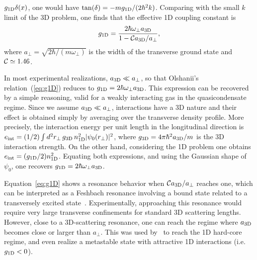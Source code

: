 \documentclass[onecolumn,amsfonts,showpacs,superscriptaddress]{revtex4-1}
\begin{document}
$g_{{\rm 1D}}\delta(x)$, one would have $\tan(\delta)=-m g_{{\rm 1D}}/(2\hbar^2 k)$. Comparing with the small $k$ limit of the 3D problem, one finds that the effective 1D coupling constant is~\citep{olshanii_atomic_1998}
\begin{equation}
g_{{\rm 1D}}=\frac{2\hbar \omega_\perp a_{{\rm 3D}} }{1-{\cal C}a_{{\rm 3D}}/a_\perp} ,
\label{eq:g1D}
\end{equation}
where $a_\perp=\sqrt{2\hbar/(m\omega_\perp)}$ is the width of the transverse ground state and ${\cal C} \simeq 1.46$.


In most experimental realizations, $a_{{\rm 3D}}\ll a_\perp$, so that Olshanii's relation~(\ref{eq:g1D}) reduces to $g_{{\rm 1D}}=2\hbar \omega_\perp a_{{\rm 3D}}$. This expression can be recovered by a simple reasoning, valid
for a weakly interacting gas in the quasicondensate regime.
Since we assume $a_{\rm 3D}\ll a_\perp$,
interactions have a 3D nature and their effect is obtained simply by averaging over the transverse density profile. More precisely, the interaction energy per unit length in the longitudinal direction is
$e_{\rm int}=(1/2)\int d^{2} r_\perp \,
g_{{\rm 3D}} \, n_{\rm 1D}^2 |\psi_0(r_\perp)|^2$, where 
$g_{\rm 3D}=4\pi\hbar^2a_{\rm 3D}/m$
is the 3D interaction strength. 
On the other hand, considering the 1D problem one obtains 
$e_{\rm int}=(g_{\rm 1D}/2) n_{\rm 1D}^2$. %
Equating both expressions, and using the Gaussian shape of $\psi_0$, one recovers $g_{{\rm 1D}}=2\hbar\omega_\perp a_{\rm 3D}$.

Equation~\eqref{eq:g1D} shows a resonance behavior when ${\cal C} a_{{\rm 3D}}/a_\perp$ reaches one,
which can be interpreted as a Feshbach resonance involving a bound state
related to a transversely excited state~\citep{bergeman_atom-atom_2003}. 
Experimentally, approaching this resonance would require very large transverse confinements for standard 3D scattering lengths.
However, close to a 3D-scattering resonance, one can reach the regime where 
$a_{{\rm 3D}}$ becomes close or larger than $a_\perp$. This was used by~\cite{haller_realization_2009}
to reach the 1D hard-core regime, and even realize a metastable state
with attractive 1D interactions (i.e. $g_{{\rm 1D}}<0$).
\end{document}
